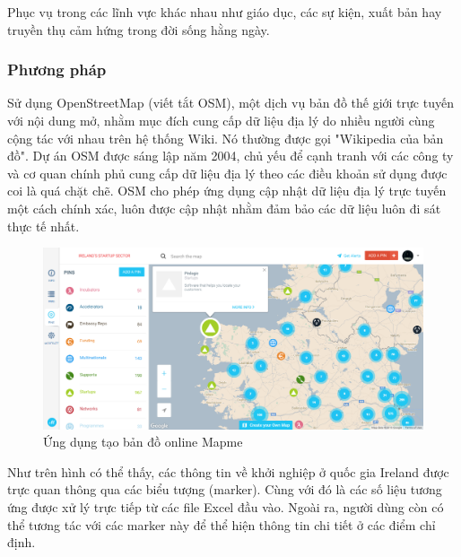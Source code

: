 \documentclass[12pt,a4paper,oneside]{article}
\begin{document}
Phục vụ trong các lĩnh vực khác nhau như giáo dục, các sự kiện, xuất bản hay truyền thụ cảm hứng trong đời sống hằng ngày.

\subsubsection{Phương pháp}
Sử dụng OpenStreetMap (viết tắt OSM)\cite{osm}, một dịch vụ bản đồ thế giới trực tuyến với nội dung mở, nhằm mục đích cung cấp dữ liệu địa lý do nhiều người cùng cộng tác với nhau trên hệ thống Wiki. Nó thường được gọi "Wikipedia của bản đồ". Dự án OSM được sáng lập năm 2004, chủ yếu để cạnh tranh với các công ty và cơ quan chính phủ cung cấp dữ liệu địa lý theo các điều khoản sử dụng được coi là quá chặt chẽ. OSM cho phép ứng dụng cập nhật dữ liệu địa lý trực tuyến một cách chính xác, luôn được cập nhật nhằm đảm bảo các dữ liệu luôn đi sát thực tế nhất.

\begin{figure}[htp]
	\begin{center}
    \includegraphics[scale=.4]{image/mapmeOSM}
    \caption{Ứng dụng tạo bản đồ online Mapme}
    \label{refhinh11}
	\end{center}
\end{figure}

Như trên hình có thể thấy, các thông tin về khởi nghiệp ở quốc gia Ireland được trực quan thông qua các biểu tượng (marker). Cùng với đó là các số liệu tương ứng được xử lý trực tiếp từ các file Excel đầu vào.
Ngoài ra, người dùng còn có thể tương tác với các marker này để thể hiện thông tin chi tiết ở các điểm chỉ định.
\end{document}
